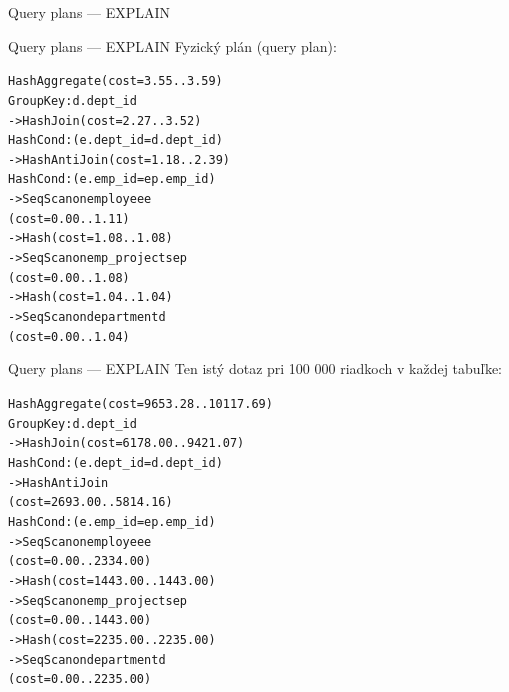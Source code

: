 \documentclass[12pt]{beamer}
\begin{document}
\begin{frame}[fragile]{Query plans --- EXPLAIN}
\begin{minipage}{0.48\linewidth}
{}
\end{minipage}
\end{frame}

\begin{frame}[fragile]{Query plans --- EXPLAIN}
Fyzický plán (query plan):
\bigskip

\scriptsize
\begin{alltt}
HashAggregate  (cost=3.55..3.59)
  Group Key: d.dept_id
  ->  Hash Join  (cost=2.27..3.52)
        Hash Cond: (e.dept_id = d.dept_id)
        ->  \alert{Hash Anti Join}  (cost=1.18..2.39)
              Hash Cond: (e.emp_id = ep.emp_id)
              ->  Seq Scan on employee e
                  (cost=0.00..1.11)
              ->  Hash  (cost=1.08..1.08)
                    ->  Seq Scan on emp_projects ep
                        (cost=0.00..1.08)
        ->  Hash  (cost=1.04..1.04)
              ->  Seq Scan on department d
                  (cost=0.00..1.04)
\end{alltt}
\end{frame}

\begin{frame}[fragile]{Query plans --- EXPLAIN}
\vspace*{6mm}
Ten istý dotaz pri 100 000 riadkoch v každej tabuľke:
\scriptsize
\begin{alltt}
HashAggregate  (cost=9653.28..10117.69)
  Group Key: d.dept_id
  ->  Hash Join  (cost=6178.00..9421.07)
        Hash Cond: (e.dept_id = d.dept_id)
        ->  \alert{Hash Anti Join}
            (cost=2693.00..5814.16)
              Hash Cond: (e.emp_id = ep.emp_id)
              ->  Seq Scan on employee e
                  (cost=0.00..2334.00)
              ->  Hash  (cost=1443.00..1443.00)
                    ->  Seq Scan on emp_projects ep
                        (cost=0.00..1443.00)
        ->  Hash  (cost=2235.00..2235.00)
              ->  Seq Scan on department d
                  (cost=0.00..2235.00)
\end{alltt}
\end{frame}
\end{document}

